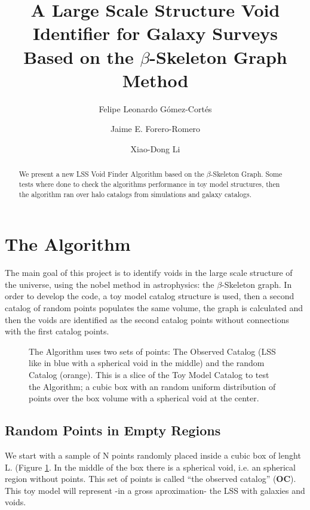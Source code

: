\documentclass[preprint]{aastex62}
\begin{document}
\title{A Large Scale Structure Void Identifier for Galaxy Surveys Based on the 
$\beta$-Skeleton Graph Method}


\author{Felipe Leonardo Gómez-Cortés}

\author{Jaime E. Forero-Romero}

\author{Xiao-Dong Li}


\begin{abstract}
  We present a new LSS Void Finder Algorithm based on the $\beta$-Skeleton Graph.
  Some tests where done to check the algorithms performance in toy model
  structures, then the algorithm ran over halo catalogs from simulations
  and galaxy catalogs.
\end{abstract}




\section{The Algorithm}

The main goal of this project is to identify voids in the large scale structure
of the universe, using the nobel method in astrophysics: the $\beta$-Skeleton
graph. In order to develop the code, a toy model catalog structure is used,
then a second catalog of random points populates the same volume, the graph is
calculated and then the voids are identified as the second catalog points
without connections with the first catalog points.

\begin{figure}
    \caption{The Algorithm uses two sets of points: The Observed Catalog
      (LSS like in blue with a spherical void in the middle) and the
      random Catalog (orange). This is a slice of the Toy Model Catalog to
      test the Algorithm; a cubic box with an random uniform distribution of
      points over the box volume with a spherical void at the center.
      \label{slice_OC_plus_RC}}
\end{figure}

\subsection{Random Points in Empty Regions}
We start with a sample of N points randomly placed inside a cubic box of
lenght L. (Figure \ref{slice_OC_plus_RC}. In the middle of the box there is a
spherical void, i.e. an spherical region without points. This set of points is
called ``the observed catalog'' (\textbf{OC}). This toy model will represent
-in a gross aproximation- the LSS with galaxies and voids.
\end{document}
